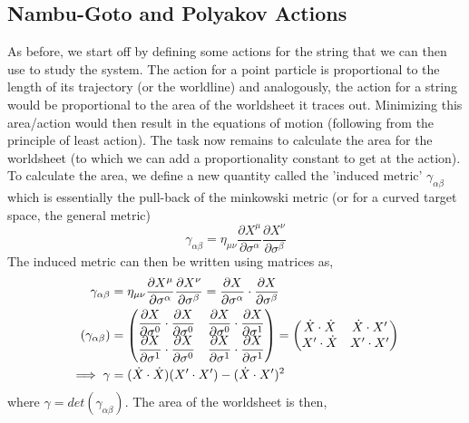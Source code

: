 \documentclass{article}
\begin{document}
\subsection{Nambu-Goto and Polyakov Actions}
As before, we start off by defining some actions for the string that we can then use to study the system. The action for a point particle is proportional to the length of its trajectory (or the worldline) and analogously, the action for a string would be proportional to the area of the worldsheet it traces out. Minimizing this area/action would then result in the equations of motion (following from the principle of least action). The task now remains to calculate the area for the worldsheet (to which we can add a proportionality constant to get at the action).\\ 

To calculate the area, we define a new quantity called the 'induced metric' $\gamma_{\alpha\beta}$ which is essentially the pull-back of the minkowski metric (or for a curved target space, the general metric) 	
\begin{equation}
	\gamma_{\alpha\beta} = \eta_{\mu\nu} \frac{\partial X^\mu}{\partial \sigma^\alpha}\frac{\partial X^\nu}{\partial \sigma^\beta} \label{eq:ind_met}
\end{equation}
The induced metric can then be written using matrices as,
\renewcommand{\arraystretch}{2.0}
\begin{align}
	\gamma_{\alpha\beta}&=\eta_{\mu\nu}\pdv{X^\mu}{\sigma^\alpha}\pdv{X^\nu}{\sigma^\beta} = \pdv{X}{\sigma^\alpha}\cdot\pdv{X}{\sigma^\beta}\\
	(\gamma_{\alpha\beta}) &= 
	\begin{pmatrix} 
		\dfrac{\partial X}{\partial \sigma^0} \cdot \dfrac{\partial X}{\partial\sigma^0} & \dfrac{\partial X}{\partial\sigma^0} \cdot \dfrac{\partial X}{\partial\sigma^1} \\
		\dfrac{\partial X}{\partial \sigma^1} \cdot \dfrac{\partial X}{\partial\sigma^0} & \dfrac{\partial X}{\partial\sigma^1} \cdot \dfrac{\partial X}{\partial\sigma^1} 
	\end{pmatrix} = 
	\begin{pmatrix}
		\dot{X} \cdot \dot{X} & \dot{X} \cdot X' \\
		X' \cdot \dot{X} & X' \cdot X'
	\end{pmatrix}\\
	\implies \gamma &= (\dot{X}\cdot\dot{X})(X'\cdot X') - (\dot{X}\cdot X')^2
\end{align}
where $\gamma = det(\gamma_{\alpha\beta})$. The area of the worldsheet is then,
\end{document}
